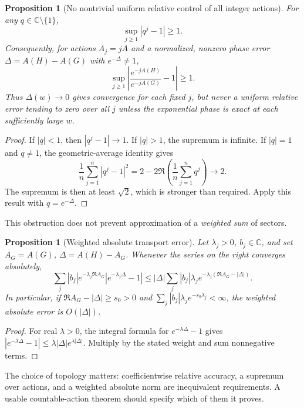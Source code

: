 \documentclass[11pt,a4paper]{article}
\newtheorem{proposition}[theorem]{Proposition}
\theoremstyle{definition}
\theoremstyle{remark}
\newcommand{\C}{\mathbb C}
\numberwithin{equation}{section}
\begin{document}
\begin{proposition}[No nontrivial uniform relative control of all integer actions]\label{prop:uniformactions}
For any $q\in\C\setminus\{1\}$,
\begin{equation}\label{eq:qobstruction}
 \sup_{j\ge1}|q^j-1|\ge1.
\end{equation}
Consequently, for actions $A_j=jA$ and a normalized, nonzero phase error $\Delta=A(H)-A(G)$ with $e^{-\Delta}\ne1$,
\[
 \sup_{j\ge1}
 \left|\frac{e^{-jA(H)}}{e^{-jA(G)}}-1\right|\ge1.
\]
Thus $\Delta(w)\to0$ gives convergence for each fixed $j$, but never a uniform relative error tending to zero over all $j$ unless the exponential phase is exact at each sufficiently large $w$.
\end{proposition}
\begin{proof}
If $|q|<1$, then $|q^j-1|\to1$. If $|q|>1$, the supremum is infinite. If $|q|=1$ and $q\ne1$, the geometric-average identity gives
\[
 \frac1n\sum_{j=1}^n |q^j-1|^2
 =2-2\Re\left(\frac1n\sum_{j=1}^nq^j\right)\longrightarrow2.
\]
The supremum is then at least $\sqrt2$, which is stronger than required. Apply this result with $q=e^{-\Delta}$.
\end{proof}

This obstruction does not prevent approximation of a \emph{weighted sum} of sectors.

\begin{proposition}[Weighted absolute transport error]\label{prop:weighted}
Let $\lambda_j>0$, $b_j\in\C$, and set $A_G=A(G)$, $\Delta=A(H)-A_G$. Whenever the series on the right converges absolutely,
\begin{equation}\label{eq:weighted}
 \sum_j |b_j|e^{-\lambda_j\Re A_G}
 |e^{-\lambda_j\Delta}-1|
 \le |\Delta|\sum_j |b_j|\lambda_j
 e^{-\lambda_j(\Re A_G-|\Delta|)}.
\end{equation}
In particular, if $\Re A_G-|\Delta|\ge s_0>0$ and
$\sum_j|b_j|\lambda_je^{-s_0\lambda_j}<\infty$, the weighted absolute error is $O(|\Delta|)$.
\end{proposition}
\begin{proof}
For real $\lambda>0$, the integral formula for $e^{-\lambda\Delta}-1$ gives
$|e^{-\lambda\Delta}-1|\le\lambda|\Delta|e^{\lambda|\Delta|}$. Multiply by the stated weight and sum nonnegative terms.
\end{proof}

The choice of topology matters: coefficientwise relative accuracy, a supremum over actions, and a weighted absolute norm are inequivalent requirements. A usable countable-action theorem should specify which of them it proves.
\end{document}
